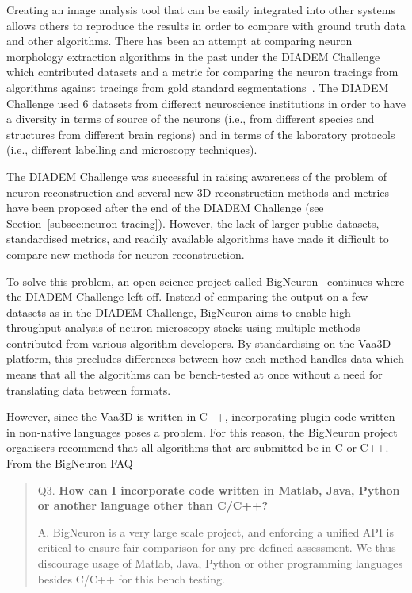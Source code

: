 Creating an image analysis tool that can be easily integrated into
other systems allows others to reproduce the results in order to
compare with ground truth data and other algorithms. There
has been an attempt at comparing neuron morphology extraction
algorithms in the past under the \acrshort{DIADEM} Challenge which
contributed datasets and a metric for comparing the neuron
tracings from algorithms against tracings from gold standard
segmentations~\autocite{DIADEM&Beyond:Liu:2011,DIADEM-dataset:Brown:2011,DIADEM-metric-Gillette2011}.
The DIADEM Challenge used 6 datasets from different neuroscience
institutions in order to have a diversity in terms of source of
the neurons (i.e., from different species and structures from
different brain regions) and in terms of the laboratory protocols
(i.e., different labelling and microscopy techniques).

The DIADEM Challenge was successful in raising awareness of the
problem of neuron reconstruction and several new 3D reconstruction
methods and metrics have been proposed after the end of the DIADEM
Challenge (see Section~\ref{subsec:neuron-tracing}).  However, the
lack of larger public datasets, standardised metrics, and readily
available algorithms have made it difficult to compare new methods
for neuron reconstruction.

To solve this problem, an open-science project called
BigNeuron~\autocite{BigNeuron:Peng:2015,DIADEM2BigNeuron:Peng:2015}
continues where the DIADEM Challenge left off. Instead of
comparing the output on a few datasets as in the DIADEM Challenge,
BigNeuron aims to enable high-throughput analysis of neuron
microscopy stacks using multiple methods contributed from various
algorithm developers. By standardising on the Vaa3D platform, this
precludes differences between how each method handles data which
means that all the algorithms can be bench-tested at once without
a need for translating data between formats.

However, since the Vaa3D is written in C++, incorporating plugin
code written in non-native languages poses a problem. For this
reason, the BigNeuron project organisers recommend that all
algorithms that are submitted be in C or C++. From the BigNeuron
FAQ~\autocite{BigNeuron:FAQ:2015}\\
\parbox{\textwidth}{
\begin{quote}
	\begin{fancyquote}
		{Q3. \bfseries How can I incorporate code written in Matlab, Java, Python or another language other than C/C++?}

		A. BigNeuron is a very large scale project, and enforcing a
		unified API is critical to ensure fair comparison for any pre-defined
		assessment. We thus discourage usage of Matlab, Java, Python or other
		programming languages besides C/C++ for this bench
		testing.
	\end{fancyquote}
\end{quote}
}

